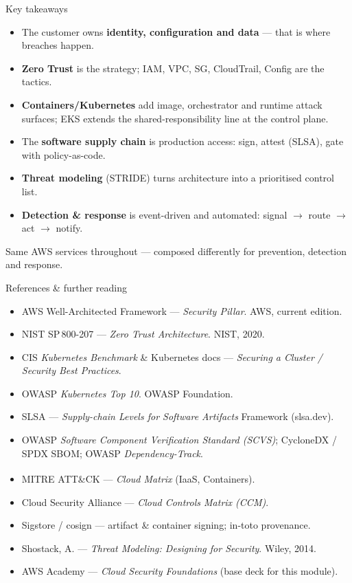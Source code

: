 \documentclass[aspectratio=169,10pt]{beamer}
\newcommand{\term}[1]{{\color{awsink}\textbf{#1}}}
\newcommand{\link}[1]{{\color{accent}\small#1}}
\begin{document}
\begin{frame}{Key takeaways}
  \small
  \begin{itemize}
    \item The customer owns \term{identity, configuration and data} --- that is where breaches happen.
    \item \term{Zero Trust} is the strategy; IAM, VPC, SG, CloudTrail, Config are the tactics.
    \item \term{Containers/Kubernetes} add image, orchestrator and runtime attack surfaces;
          EKS extends the shared-responsibility line at the control plane.
    \item The \term{software supply chain} is production access: sign, attest (SLSA), gate with policy-as-code.
    \item \term{Threat modeling} (STRIDE) turns architecture into a prioritised control list.
    \item \term{Detection \& response} is event-driven and automated: signal $\to$ route $\to$ act $\to$ notify.
  \end{itemize}
  \vfill
  {\footnotesize\color{midgray}Same AWS services throughout --- composed differently for prevention,
  detection and response.}
\end{frame}

\begin{frame}{References \& further reading}
  \footnotesize
  \begin{itemize}\setlength\itemsep{2pt}
    \item AWS Well-Architected Framework --- \emph{Security Pillar}. AWS, current edition.
    \item NIST SP\,800-207 --- \emph{Zero Trust Architecture}. NIST, 2020.
    \item CIS \emph{Kubernetes Benchmark} \& Kubernetes docs --- \emph{Securing a Cluster / Security Best Practices}.
    \item OWASP \emph{Kubernetes Top 10}. OWASP Foundation.
    \item SLSA --- \emph{Supply-chain Levels for Software Artifacts} Framework (\link{slsa.dev}).
    \item OWASP \emph{Software Component Verification Standard (SCVS)}; CycloneDX / SPDX SBOM;
          OWASP \emph{Dependency-Track}.
    \item MITRE ATT\&CK\textsuperscript{\textregistered} --- \emph{Cloud Matrix} (IaaS, Containers).
    \item Cloud Security Alliance --- \emph{Cloud Controls Matrix (CCM)}.
    \item Sigstore / cosign --- artifact \& container signing; in-toto provenance.
    \item Shostack, A. --- \emph{Threat Modeling: Designing for Security}. Wiley, 2014.
    \item AWS Academy --- \emph{Cloud Security Foundations} (base deck for this module).
  \end{itemize}
\end{frame}
\end{document}
